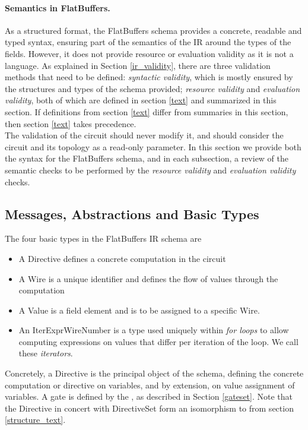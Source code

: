 \paragraph{Semantics in FlatBuffers.}
As a structured format, the FlatBuffers schema provides a concrete, readable and typed syntax, ensuring part of the semantics of the IR around the types of the fields. However, it does not provide resource or evaluation validity as it is not a language. As explained in Section \ref{ir_validity}, there are three validation methods that need to be defined: \emph{syntactic validity}, which is mostly ensured by the structures and types of the schema provided; \emph{resource validity} and \emph{evaluation validity}, both of which are defined in section \ref{text} and summarized in this section.
If definitions from section \ref{text} differ from summaries in this section, then section \ref{text} takes precedence.\\

The validation of the circuit should never modify it, and should consider the circuit and its topology as a read-only parameter. In this section we provide both the syntax for the FlatBuffers schema, and in each subsection, a review of the semantic checks to be performed by the \emph{resource validity} and \emph{evaluation validity} checks.

\subsection{Messages, Abstractions and Basic Types}\label{binary_abstractions}

The four basic types in the FlatBuffers IR schema are
\begin{itemize}
    \item A \textsf{Directive} defines a concrete computation in the circuit
    \item A \textsf{Wire} is a unique identifier and defines the flow of values through the computation
    \item A \textsf{Value} is a field element and is to be assigned to a specific \textsf{Wire}.
    \item An \textsf{IterExprWireNumber} is a type used uniquely within \emph{for loops} to allow computing expressions on values that differ per iteration of the loop. We call these \emph{iterators}.
\end{itemize}

Concretely, a \textsf{Directive} is the principal object of the schema, defining the concrete computation or directive on variables, and by extension, on value assignment of variables. A gate is defined by the , as described in Section \ref{gateset}. Note that the \textsf{Directive} in concert with \textsf{DirectiveSet} form an isomorphism to  from section \ref{structure_text}.

